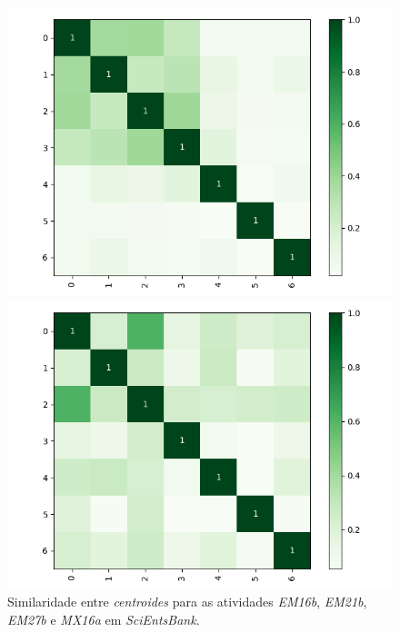 \begin{figure}[!h]
\begin{minipage}[t]{.45\textwidth}
\includegraphics[width=\textwidth]{figuras/seb/hm-EM27b.png} 
\end{minipage}%
\begin{minipage}[t]{.45\textwidth}
\centering
\includegraphics[width=\textwidth]{figuras/seb/hm-MX16a.png} 
\end{minipage}
\caption{Similaridade entre \textit{centroides} para as atividades \textit{EM16b}, \textit{EM21b}, \textit{EM27b} e \textit{MX16a} em \textit{SciEntsBank}.}
\label{fig-hmSciEntsBank}
\end{figure}

